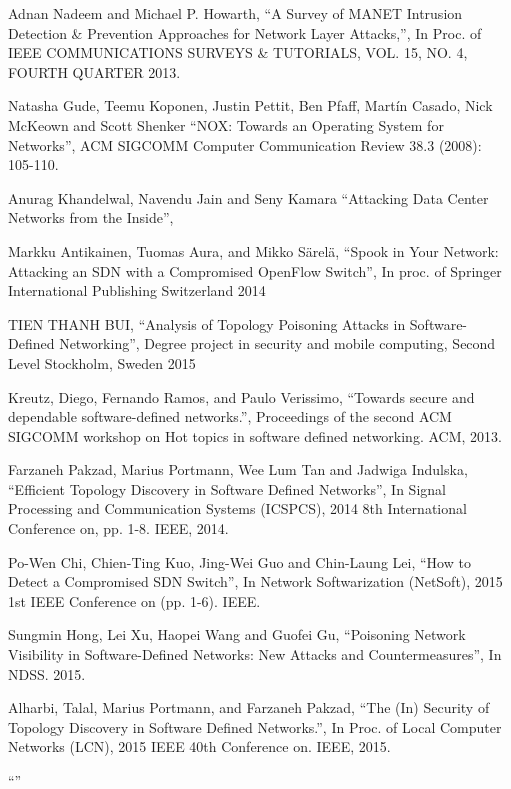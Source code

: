 \begin{thebibliography}{1}

Adnan Nadeem and Michael P. Howarth,
``A Survey of MANET Intrusion Detection \& Prevention Approaches for Network Layer Attacks,'', In Proc. of IEEE COMMUNICATIONS SURVEYS \& TUTORIALS, VOL. 15, NO. 4, FOURTH QUARTER 2013.

Natasha Gude, Teemu Koponen, Justin Pettit, Ben Pfaff, Martín Casado, Nick McKeown and Scott Shenker
``NOX: Towards an Operating System for Networks'', ACM SIGCOMM Computer Communication Review 38.3 (2008): 105-110.

\bibitem{}
Anurag Khandelwal, Navendu Jain and Seny Kamara
``Attacking Data Center Networks from the Inside'', 

\bibitem{}
Markku Antikainen, Tuomas Aura, and Mikko Särelä,
``Spook in Your Network: Attacking an SDN with a Compromised OpenFlow Switch'', In proc. of Springer International Publishing Switzerland 2014

TIEN THANH BUI,
``Analysis of Topology Poisoning Attacks in Software-Defined Networking'', Degree project in security and mobile computing, Second Level Stockholm, Sweden 2015

Kreutz, Diego, Fernando Ramos, and Paulo Verissimo,
``Towards secure and dependable software-defined networks.'', Proceedings of the second ACM SIGCOMM workshop on Hot topics in software defined networking. ACM, 2013.

\bibitem{}
Farzaneh Pakzad, Marius Portmann, Wee Lum Tan and Jadwiga Indulska,
``Efficient Topology Discovery in Software Defined Networks'', In Signal Processing and Communication Systems (ICSPCS), 2014 8th International Conference on, pp. 1-8. IEEE, 2014. 

Po-Wen Chi, Chien-Ting Kuo, Jing-Wei Guo and Chin-Laung Lei,
``How to Detect a Compromised SDN Switch'', In Network Softwarization (NetSoft), 2015 1st IEEE Conference on (pp. 1-6). IEEE.

Sungmin Hong, Lei Xu, Haopei Wang and Guofei Gu,
``Poisoning Network Visibility in Software-Defined Networks: New Attacks and Countermeasures'', In NDSS. 2015. 

\bibitem{}
Alharbi, Talal, Marius Portmann, and Farzaneh Pakzad,
``The (In) Security of Topology Discovery in Software Defined Networks.'', In Proc. of Local Computer Networks (LCN), 2015 IEEE 40th Conference on. IEEE, 2015.

\bibitem{}
``''


\end{thebibliography}
